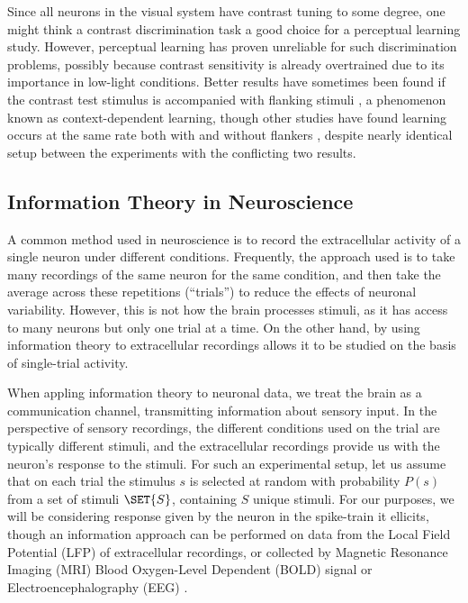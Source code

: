 Since all neurons in the visual system have contrast tuning to some degree, one might think a contrast discrimination task a good choice for a perceptual learning study. However, perceptual learning has proven unreliable for such discrimination problems, possibly because contrast sensitivity is already overtrained due to its importance in low-light conditions. Better results have sometimes been found if the contrast test stimulus is accompanied with flanking stimuli \cite{Adini2002}, a phenomenon known as context-dependent learning, though other studies have found learning occurs at the same rate both with and without flankers \cite{Yu2004}, despite nearly identical setup between the experiments with the conflicting two results.

\subsection{Information Theory in Neuroscience}
\label{sec:bgit}

A common method used in neuroscience is to record the extracellular activity of a single neuron under different conditions. Frequently, the approach used is to take many recordings of the same neuron for the same condition, and then take the average across these repetitions (``trials'') to reduce the effects of neuronal variability. However, this is not how the brain processes stimuli, as it has access to many neurons but only one trial at a time.
On the other hand, by using information theory to extracellular recordings allows it to be studied on the basis of single-trial activity.

When appling information theory to neuronal data, we treat the brain as a communication channel, transmitting information about sensory input. 
In the perspective of sensory recordings, the different conditions used on the trial are typically different stimuli, and the extracellular recordings provide us with the neuron's response to the stimuli.
For such an experimental setup, let us assume that on each trial the stimulus $s$ is selected at random with probability $P(s)$ from a set of stimuli $\SET{S}$, containing $S$ unique stimuli.
For our purposes, we will be considering response given by the neuron in the spike-train it ellicits, though an information approach can be performed on data from the Local Field Potential (LFP) of extracellular recordings, or collected by Magnetic Resonance Imaging (MRI) Blood Oxygen-Level Dependent (BOLD) signal or Electroencephalography (EEG) \cite{Magri2009,Quiroga2009}.

